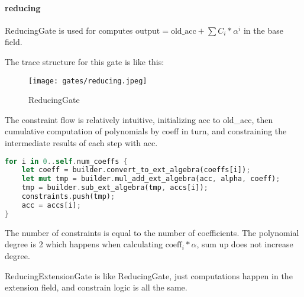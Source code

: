 \paragraph{reducing}

\hspace*{\fill}

\indent ReducingGate is used for computes $\text{output} = \text{old\_acc} + \sum C_i*\alpha^i$ in the base field.

The trace structure for this gate is like this:

\begin{figure}[!ht]
    \centering
    \texttt{[image: gates/reducing.jpeg]}
    \caption{ReducingGate}
    \label{fig:reducing}
\end{figure}

The constraint flow is relatively intuitive, initializing acc to old\_acc, then cumulative computation of polynomials by coeff in turn, 
and constraining the intermediate results of each step with acc.

\begin{lstlisting}[language=rust]
for i in 0..self.num_coeffs {
    let coeff = builder.convert_to_ext_algebra(coeffs[i]);
    let mut tmp = builder.mul_add_ext_algebra(acc, alpha, coeff);
    tmp = builder.sub_ext_algebra(tmp, accs[i]);
    constraints.push(tmp);
    acc = accs[i];
}
\end{lstlisting}

The number of constraints is equal to the number of coefficients. The polynomial degree is 2 which happens when calculating $\text{coeff}_i * \alpha$, sum up does not increase degree.

ReducingExtensionGate is like ReducingGate, just computations happen in the extension field, and constrain logic is all the same.
